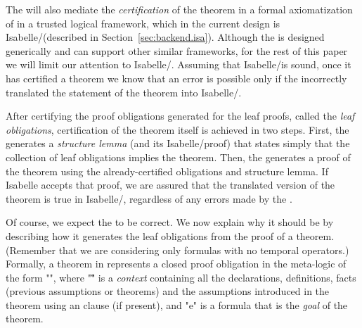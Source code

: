 \documentclass[a4paper]{easychair}
\begin{document}
The \PM will also mediate the \textit{certification} of the \tlatwo
theorem in a formal axiomatization of \tlatwo in a trusted logical
framework, which in the current design is Isabelle/\tlaplus (described
in Section~\ref{sec:backend.isa}). Although the \PM is designed
generically and can support other similar frameworks, for the rest of
this paper we will limit our attention to Isabelle/\tlaplus.
Assuming that Isabelle/\tlaplus is sound, once it has certified a
theorem we know that an error is possible only if the \PM incorrectly
translated the statement of the theorem into Isabelle/\tlaplus.

After certifying the proof obligations generated for the leaf proofs,
called the \textit{leaf obligations}, certification of the theorem
itself is achieved in two steps. First, the \PM generates a
\emph{structure lemma} (and its Isabelle/\tlaplus proof) that states
simply that the collection of leaf obligations implies the theorem.
Then, the \PM generates a proof of the theorem using the
already-certified obligations and structure lemma.  If Isabelle
accepts that proof, we are assured that the translated version of the
theorem is true in Isabelle/\tlaplus, regardless of any errors made by
the \PM.

Of course, we expect the \PM to be correct.  We now explain why it
should be by describing how it generates the leaf obligations from the
proof of a theorem. (Remember that we are considering only \tlatwo
formulas with no temporal operators.)
Formally, a theorem in \tlatwo represents a closed proof obligation in
the \tlatwo meta-logic of the form "", where "\G" is a
\emph{context} containing all the declarations, definitions, facts
(previous assumptions or theorems) and the assumptions introduced in
the theorem using an \ASSUME clause (if present), and "e" is a \tlatwo
formula that is the \emph{goal} of the theorem.
\end{document}
